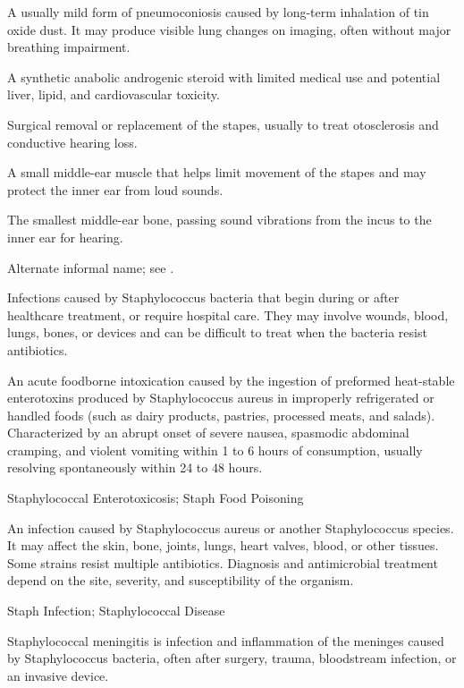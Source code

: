  A usually mild form of pneumoconiosis caused by long-term inhalation of tin oxide dust. It may produce visible lung changes on imaging, often without major breathing impairment.

 A synthetic anabolic androgenic steroid with limited medical use and potential liver, lipid, and cardiovascular toxicity.

 Surgical removal or replacement of the stapes, usually to treat otosclerosis and conductive hearing loss.

 A small middle-ear muscle that helps limit movement of the stapes and may protect the inner ear from loud sounds.

 The smallest middle-ear bone, passing sound vibrations from the incus to the inner ear for hearing.

 Alternate informal name; see .

 Infections caused by Staphylococcus bacteria that begin during or after healthcare treatment, or require hospital care. They may involve wounds, blood, lungs, bones, or devices and can be difficult to treat when the bacteria resist antibiotics.

 An acute foodborne intoxication caused by the ingestion of preformed heat-stable enterotoxins produced by Staphylococcus aureus in improperly refrigerated or handled foods (such as dairy products, pastries, processed meats, and salads). Characterized by an abrupt onset of severe nausea, spasmodic abdominal cramping, and violent vomiting within 1 to 6 hours of consumption, usually resolving spontaneously within 24 to 48 hours.

\synonyms
Staphylococcal Enterotoxicosis; Staph Food Poisoning

 An infection caused by Staphylococcus aureus or another Staphylococcus species. It may affect
the skin, bone, joints, lungs, heart valves, blood, or other tissues. Some strains resist
multiple antibiotics. Diagnosis and antimicrobial treatment depend on the site, severity,
and susceptibility of the organism.

\synonyms
Staph Infection; Staphylococcal Disease

 Staphylococcal meningitis is infection and inflammation of the meninges caused by Staphylococcus bacteria, often after surgery, trauma, bloodstream infection, or an invasive device.

